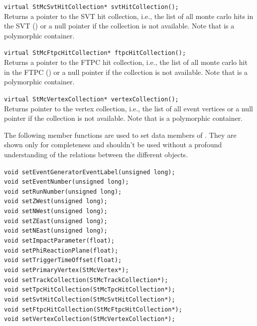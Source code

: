 \begin{Entry}
    \verb+virtual StMcSvtHitCollection* svtHitCollection();+\\
    Returns a pointer to the SVT hit collection, i.e., the list of all
    monte carlo hits in the SVT () or a null pointer if the
    collection is not available.  Note that 
    is a polymorphic container.


    \verb+virtual StMcFtpcHitCollection* ftpcHitCollection();+\\
    Returns a pointer to the FTPC hit collection, i.e., the list of
    all monte carlo hit in the FTPC () or a null pointer if the
    collection is not available.  Note that 
    is a polymorphic container.


    \verb+virtual StMcVertexCollection* vertexCollection();+\\
    Returns pointer to the vertex collection, i.e., the list of all
    event vertices or a null pointer if the collection is not
    available.  Note that  is a polymorphic
    container.

    The following member functions are used to set data members of .
    They are shown only for completeness and shouldn't be used without
    a profound understanding of the relations between the different objects.

    \verb+void setEventGeneratorEventLabel(unsigned long);+\\
    \verb+void setEventNumber(unsigned long);+\\
    \verb+void setRunNumber(unsigned long);+\\
    \verb+void setZWest(unsigned long);+\\
    \verb+void setNWest(unsigned long);+\\
    \verb+void setZEast(unsigned long);+\\
    \verb+void setNEast(unsigned long);+\\
    \verb+void setImpactParameter(float);+\\
    \verb+void setPhiReactionPlane(float);+\\
    \verb+void setTriggerTimeOffset(float);+\\
    \verb+void setPrimaryVertex(StMcVertex*);+\\
    \verb+void setTrackCollection(StMcTrackCollection*);+\\
    \verb+void setTpcHitCollection(StMcTpcHitCollection*);+\\
    \verb+void setSvtHitCollection(StMcSvtHitCollection*);+\\
    \verb+void setFtpcHitCollection(StMcFtpcHitCollection*);+\\
    \verb+void setVertexCollection(StMcVertexCollection*);+\\


\end{Entry}

